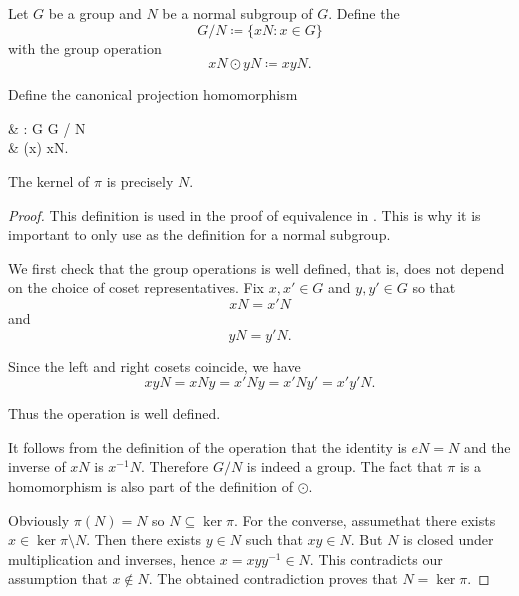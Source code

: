 \begin{definition}\label{def:quotient_group}
  Let \( G \) be a group and \( N \) be a normal subgroup of \( G \). Define the 
  \begin{equation*}
    G / N \coloneqq \{ xN \colon x \in G \}
  \end{equation*}
  with the group operation
  \begin{equation*}
    xN \odot yN \coloneqq xyN.
  \end{equation*}

  Define the canonical projection homomorphism
  \begin{BreakableAlign*}
     & \pi: G \to G / N     \\
     & \pi(x) \coloneqq xN.
  \end{BreakableAlign*}

  The kernel of \( \pi \) is precisely \( N \).
\end{definition}
\begin{proof}
  This definition is used in the proof of equivalence in . This is why it is important to only use  as the definition for a normal subgroup.

  We first check that the group operations is well defined, that is, does not depend on the choice of coset representatives. Fix \( x, x' \in G \) and \( y, y' \in G \) so that
  \begin{equation*}
    xN = x'N
  \end{equation*}
  and
  \begin{equation*}
    yN = y'N.
  \end{equation*}

  Since the left and right cosets coincide, we have
  \begin{equation*}
    xyN = xNy = x'Ny = x'Ny' = x'y'N.
  \end{equation*}

  Thus the operation is well defined.

  It follows from the definition of the operation that the identity is \( eN = N \) and the inverse of \( xN \) is \( x^{-1} N \). Therefore \( G / N \) is indeed a group. The fact that \( \pi \) is a homomorphism is also part of the definition of \( \odot \).

  Obviously \( \pi(N) = N \) so \( N \subseteq \ker \pi \). For the converse, assume\LEM that there exists \( x \in \ker \pi \setminus N \). Then there exists \( y \in N \) such that \( xy \in N \). But \( N \) is closed under multiplication and inverses, hence \( x = xyy^{-1} \in N \). This contradicts our assumption that \( x \not\in N \). The obtained contradiction proves that \( N = \ker \pi \).
\end{proof}

